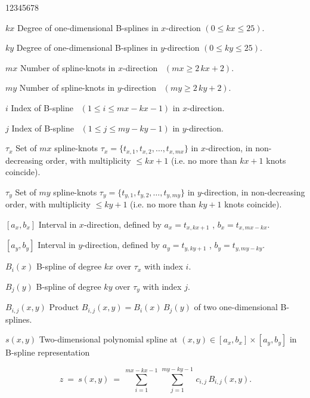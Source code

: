 \begin{DL}{12345678}
\item[$kx$] Degree of one-dimensional B-splines in $x$-direction
 $(0 \le kx \le 25)$.
\item[$ky$] Degree of one-dimensional B-splines in $y$-direction
 $(0 \le ky \le 25)$.
\item[$mx$] Number of spline-knots in $x$-direction \,
 $(mx \ge 2 \, kx+2)$.
\item[$my$] Number of spline-knots in $y$-direction \,
 $(my \ge 2 \, ky+2)$.
\item[$i$] Index of B-spline \, $(1 \le i \le mx-kx-1)$ in
 $x$-direction.
\item[$j$] Index of B-spline \, $(1 \le j \le my-ky-1)$ in
 $y$-direction.
\item[$\tau_x$] Set of $mx$ spline-knots
 $\tau_x = \{ t_{x,1},t_{x,2}, \ldots ,t_{x,mx}\}$ in $x$-direction,
 in non-decreasing order, with multiplicity $\le kx+1$
 (i.e. no more than $kx+1$ knots coincide).
\item[$\tau_y$] Set of $my$ spline-knots
 $\tau_y = \{ t_{y,1},t_{y,2}, \ldots ,t_{y,my}\}$ in $y$-direction,
 in non-decreasing order, with multiplicity  $\le ky+1$
 (i.e. no more than $ky+1$ knots coincide).
\item[{$[a_x,b_x]$}] Interval in $x$-direction,
 defined by $a_x=t_{x,kx+1}$ , $b_x=t_{x,mx-kx}$.
\item[{$[a_y,b_y]$}] Interval in $y$-direction,
 defined by $a_y=t_{y,ky+1}$ , $b_y=t_{y,my-ky}$.
\item[$B_i(x)$] B-spline of degree $kx$ over $\tau_x$ with index $i$.
\item[$B_j(y)$] B-spline of degree $ky$ over $\tau_y$ with index $j$.
\item[$B_{i,j}(x,y)$] Product $B_{i,j}(x,y) = B_i(x) \, B_j(y)$ of
 two one-dimensional B-splines.
\item[$s(x,y)$] Two-dimensional polynomial spline at
 $(x,y) \in [a_x,b_x] \times [a_y,b_y]$
 in B-spline representation
\end{DL}
$$ z \ = \ s(x,y) \ = \ \sum_{i=1}^{mx-kx-1}\,\sum_{j=1}^{my-ky-1}\,
c_{i,j}\,B_{i,j}(x,y).$$

